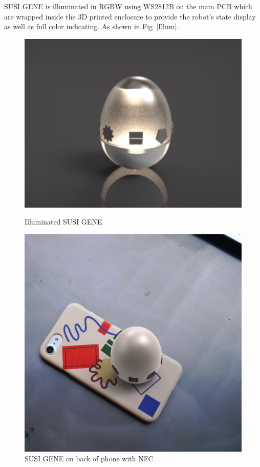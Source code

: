 \documentclass[manuscript,screen]{acmart}
\begin{document}
SUSI GENE is illuminated in RGBW using WS2812B on the main PCB which are wrapped inside the 3D printed enclosure to provide the robot’s state display as well as full color indicating. As shown in Fig~\ref{Illum}.

\begin{figure}
  \begin{minipage}{0.49\columnwidth}
    \centering
    \includegraphics[width=0.99\columnwidth]{egg4.jpg}
    \caption{Illuminated SUSI GENE}
    \label{Illum}
  \end{minipage}\hfill
  \begin{minipage}{0.49\columnwidth}
    \centering
    \includegraphics[width=0.99\columnwidth]{egg7.jpg}
    \caption{SUSI GENE on back of phone with NFC}
    \label{NFCback}
  \end{minipage}
\end{figure}
\end{document}
